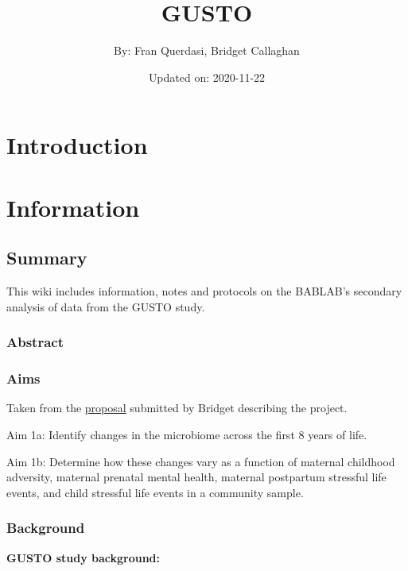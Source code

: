 \documentclass[
]{book}
\title{GUSTO}
\author{By: Fran Querdasi, Bridget Callaghan}
\date{Updated on: 2020-11-22}
\begin{document}
\maketitle

{
\setcounter{tocdepth}{1}
\tableofcontents
}
\hypertarget{introduction}{%
\chapter{Introduction}\label{introduction}}

\hypertarget{information}{%
\chapter{Information}\label{information}}

\hypertarget{summary}{%
\section{Summary}\label{summary}}

This wiki includes information, notes and protocols on the BABLAB's secondary analysis of data from the GUSTO study.

\hypertarget{abstract}{%
\subsection{Abstract}\label{abstract}}

\hypertarget{aims}{%
\subsection{Aims}\label{aims}}

Taken from the \href{https://ucla.app.box.com/file/740587024475}{proposal} submitted by Bridget describing the project.

Aim 1a: Identify changes in the microbiome across the first 8 years of life.

Aim 1b: Determine how these changes vary as a function of maternal childhood adversity, maternal prenatal mental health, maternal postpartum stressful life events, and child stressful life events in a community sample.

\hypertarget{background}{%
\subsection{Background}\label{background}}

\textbf{GUSTO study background:}
\end{document}
